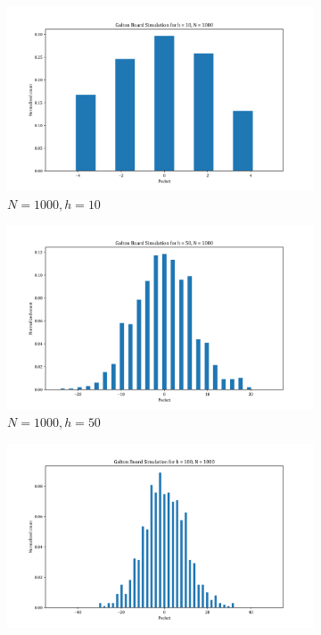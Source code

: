 \begin{figure}[H]
    \centering
    \begin{subfigure}{0.4\textwidth}
        \centering
        \includegraphics[width=\textwidth]{assets/images/a2d1.png}
        \caption{$N = 1000, h = 10$}
        \label{fig_a2d1}
    \end{subfigure}
    \begin{subfigure}{0.4\textwidth}
        \centering
        \includegraphics[width=\textwidth]{assets/images/a2d2.png}
        \caption{$N = 1000, h = 50$}
        \label{fig_a2d2}
    \end{subfigure}
    \begin{subfigure}{0.4\textwidth}
        \centering
        \includegraphics[width=\textwidth]{assets/images/a2d3.png}

\end{subfigure}
\end{figure}

